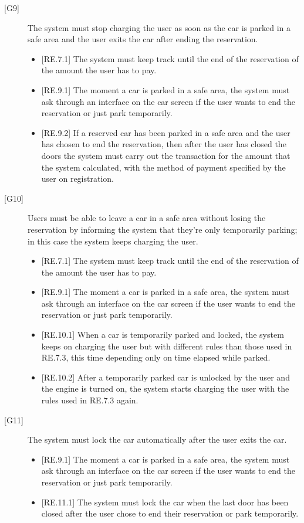 \documentclass[english]{article}
\begin{document}
\begin{description}
\item[{[G9]}]{The system must stop charging the user as soon as the car is parked in a safe area and the user exits the car after ending the reservation.
\begin{itemize}
	\item{[RE.7.1] The system must keep track until the end of the reservation of the amount the user has to pay.}
	\item{[RE.9.1] The moment a car is parked in a safe area, the system must ask through an interface on the car screen if the user wants to end the reservation or just park temporarily.}
	\item{[RE.9.2] If a reserved car has been parked in a safe area and the user has chosen to end the reservation, then after the user has closed the doors the system must carry out the transaction for the amount that the system calculated, with the method of payment specified by the user on registration.}
\end{itemize}
}

\item[{[G10]}]{Users must be able to leave a car in a safe area without losing the reservation by informing the system that they’re only temporarily parking; in this case the system keeps charging the user.
\begin{itemize}
	\item{[RE.7.1] The system must keep track until the end of the reservation of the amount the user has to pay.}
	\item{[RE.9.1] The moment a car is parked in a safe area, the system must ask through an interface on the car screen if the user wants to end the reservation or just park temporarily.}
	\item{[RE.10.1] When a car is temporarily parked and locked, the system keeps on charging the user but with different rules than those used in RE.7.3, this time depending only on time elapsed while parked.}
	\item{[RE.10.2] After a temporarily parked car is unlocked by the user and the engine is turned on, the system starts charging the user with the rules used in RE.7.3 again.}
\end{itemize}
}

\item[{[G11]}]{The system must lock the car automatically after the user exits the car.
\begin{itemize}
	\item{[RE.9.1] The moment a car is parked in a safe area, the system must ask through an interface on the car screen if the user wants to end the reservation or just park temporarily.}
	\item{[RE.11.1] The system must lock the car when the last door has been closed after the user chose to end their reservation or park temporarily.}
\end{itemize}
}


\end{description}
\end{document}
